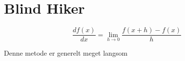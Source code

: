 \section{Blind Hiker}

\[
\frac{df(x)}{dx} = \lim_{h \to 0} \frac{f(x+h)-f(x)}{h}
\]

Denne metode er generelt meget langsom

